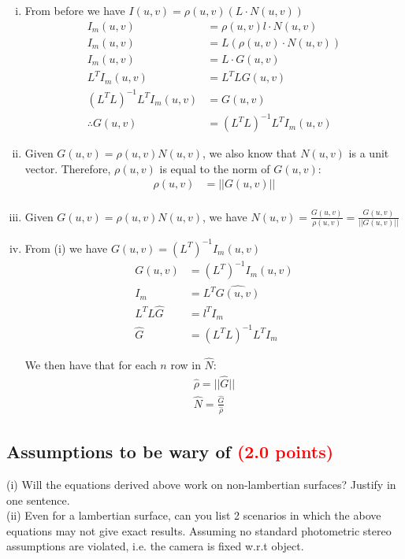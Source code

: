 \documentclass[answers]{exam}
\newcommand{\mypoints}[1]{\textcolor{red}{(#1 points)}}
\begin{document}
\begin{solution}
\begin{enumerate}[i)]
\item From before we have $I(u,v)=\rho(u,v)(L\cdot N(u,v))$
\begin{align*}
I_m(u,v)&=\rho(u,v) l \cdot N(u,v)\\
I_m(u,v)&=L (\rho(u,v)\cdot N(u,v))\\
I_m(u,v)&=L \cdot G(u,v)\\
L^T I_m(u,v)&=L^T L G(u,v)\\
(L^T L)^{-1} L^T I_m(u,v)&=G(u,v)\\
\therefore G(u,v) &= (L^T L)^{-1} L^T I_m(u,v)
\end{align*}
\item Given $G(u,v) = \rho(u,v) N(u,v)$, we also know that $N(u,v)$ is a unit vector. Therefore, $\rho(u,v)$ is equal to the norm of $G(u,v)$:
\begin{align*}
    \rho(u,v) &= ||G(u,v)||\\
\end{align*}

\item Given $G(u,v) = \rho(u,v) N(u,v)$, we have $N(u,v)=\frac{G(u,v)}{\rho(u,v)}=\frac{G(u,v)}{||G(u,v)||}$

\item From (i) we have $G(u,v) = (L^T)^{-1} I_m(u,v)$ 
\begin{align*}
    G(u,v) &= (L^T)^{-1} I_m(u,v) \\
    I_m &= L^T \hat{G(u,v)} \\
    L^T L \hat{G} &= l^T I_m \\
    \hat{G} &= (L^T L)^{-1} L^T I_m
\end{align*}

We then have that for each $n$ row in $\hat{N}$:
\begin{align*}
\hat{\rho} = ||\hat{G}|| \\
\hat{N} = \frac{\hat{G}}{\hat{\rho}}
\end{align*}

\end{enumerate}
\end{solution}
\subsection{Assumptions to be wary of \mypoints{2.0}}\label{sssec:Space_Invariance}
(i) Will the equations derived above work on non-lambertian surfaces? Justify in one sentence. \\ 
(ii) Even for a lambertian surface, can you list 2 scenarios in which the above equations may not give exact results. Assuming no standard photometric stereo assumptions are violated, i.e. the camera is fixed w.r.t object. 
\end{document}
